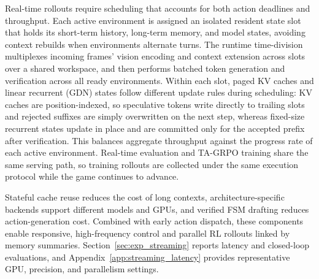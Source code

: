 Real-time rollouts require scheduling that accounts for both action deadlines and throughput. Each active environment is assigned an isolated resident state slot that holds its short-term history, long-term memory, and model states, avoiding context rebuilds when environments alternate turns. The runtime time-division multiplexes incoming frames' vision encoding and context extension across slots over a shared workspace, and then performs batched token generation and verification across all ready environments. Within each slot, paged KV caches and linear recurrent (GDN) states follow different update rules during scheduling: KV caches are position-indexed, so speculative tokens write directly to trailing slots and rejected suffixes are simply overwritten on the next step, whereas fixed-size recurrent states update in place and are committed only for the accepted prefix after verification. This balances aggregate throughput against the progress rate of each active environment. Real-time evaluation and TA-GRPO training share the same serving path, so training rollouts are collected under the same execution protocol while the game continues to advance.

Stateful cache reuse reduces the cost of long contexts, architecture-specific backends support different models and GPUs, and verified FSM drafting reduces action-generation cost. Combined with early action dispatch, these components enable responsive, high-frequency control and parallel RL rollouts linked by memory summaries. Section~\ref{sec:exp_streaming} reports latency and closed-loop evaluations, and Appendix~\ref{app:streaming_latency} provides representative GPU, precision, and parallelism settings.
